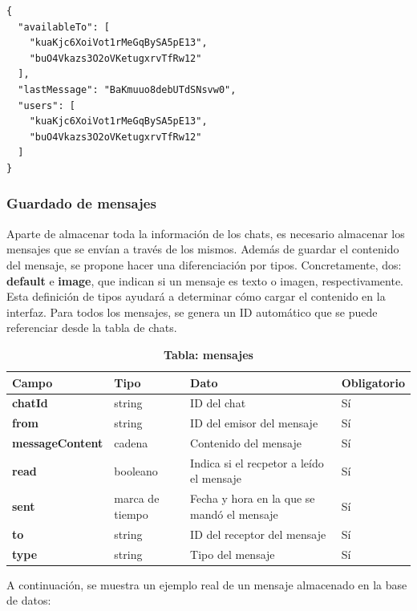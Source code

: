 \documentclass[a4paper, 12pt]{article}
\begin{document}
\begin{verbatim}
{
  "availableTo": [
    "kuaKjc6XoiVot1rMeGqBySA5pE13",
    "buO4Vkazs3O2oVKetugxrvTfRw12"
  ],
  "lastMessage": "BaKmuuo8debUTdSNsvw0",
  "users": [
    "kuaKjc6XoiVot1rMeGqBySA5pE13",
    "buO4Vkazs3O2oVKetugxrvTfRw12"
  ]
}
\end{verbatim}

\subsubsection{Guardado de mensajes}

Aparte de almacenar toda la información de los chats, es necesario almacenar los mensajes que se envían a través de los mismos. Además de guardar el contenido del mensaje, se propone hacer una diferenciación por tipos. Concretamente, dos: \textbf{default} e \textbf{image}, que indican si un mensaje es texto o imagen, respectivamente. Esta definición de tipos ayudará a determinar cómo cargar el contenido en la interfaz. Para todos los mensajes, se genera un ID automático que se puede referenciar desde la tabla de chats.

\begin{table}[H]
\captionsetup{justification=raggedright,singlelinecheck=false}
\captionsetup{labelformat=empty}
\caption{\textbf{Tabla: mensajes}}
\label{tab:messages}
	\begin{tabular}{|m{3.2cm}|m{2cm}|m{5cm}|m{3cm}|}
	\hline
	\textbf{Campo} & \textbf{Tipo} & \textbf{Dato} & \textbf{Obligatorio} \\ 
	\hline
	\textbf{chatId} & string & ID del chat &  Sí \\ 
	\hline
	\textbf{from} & string & ID del emisor del mensaje &  Sí \\ 
	\hline
	\textbf{messageContent} & cadena & Contenido del mensaje &  Sí \\ 
	\hline
	\textbf{read} & booleano & Indica si el recpetor a leído el mensaje &  Sí \\ 
	\hline
	\textbf{sent} & marca de tiempo & Fecha y hora en la que se mandó el mensaje & Sí \\ 
	\hline
	\textbf{to} & string & ID del receptor del mensaje & Sí \\ 
	\hline
	\textbf{type} & string & Tipo del mensaje & Sí \\ 
	\hline
	\end{tabular}
\end{table}

A continuación, se muestra un ejemplo real de un mensaje almacenado en la base de datos:
\end{document}
